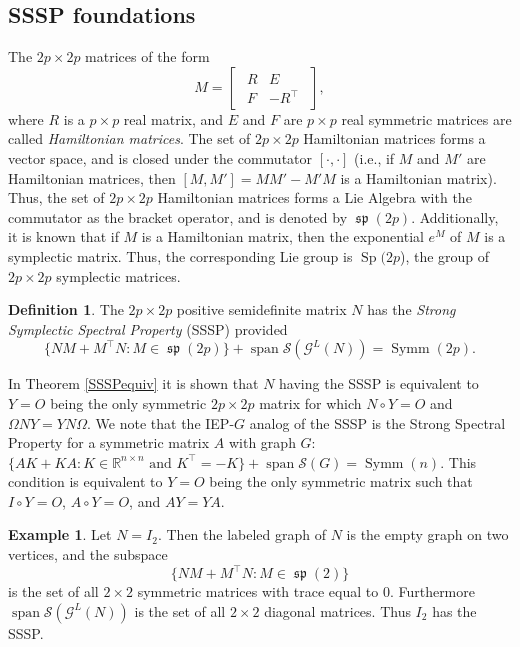 \documentclass[12pt]{article}
\theoremstyle{definition}
\theoremstyle{definition}
\newtheorem{defn}[thm]{Definition}
\theoremstyle{definition}
\newtheorem{ex}[thm]{Example}
\numberwithin{figure}{section}
\numberwithin{equation}{section}
\newcommand{\R}{\mathbb{R}}
\newcommand{\Span}{\operatorname{span}}
\newcommand{\SG}{\mathcal{S}(G)}
\newcommand{\symm}{\operatorname{Symm}}
\newcommand{\Sp}{\operatorname{Sp}}
\newcommand{\spLA}{\operatorname{\mathfrak{sp}}}
\newcommand{\Rnn}{\R^{n\times n}}
\newcommand{\trans}{^{\top}}
\newcommand{\beq}{\begin{equation}}
\newcommand{\eeq}{\end{equation}}
\begin{document}
\subsection{SSSP foundations}
The  $2p \times 2p$ matrices of the form 
\beq\label{Eq:HamForm}
M= \begin{bmatrix}
\begin{array}{cc}
R & E \\ 
F & -R^\top
\end{array} 
\end{bmatrix},
\eeq
where $R$ is a $p\times p$ real matrix, and  $E$ and $F$ are $p\times p$ real symmetric matrices
are called \textit{Hamiltonian matrices}. The set of $2p \times 2p$ Hamiltonian 
matrices {forms} a vector space, and is closed under the commutator $[\cdot, \cdot]$ (i.e., if $M$ and $M'$ are 
Hamiltonian matrices, then $[M,M']=MM'-M'M$ is a Hamiltonian matrix). 
Thus, the set of $2p\times 2p$ Hamiltonian matrices forms a Lie Algebra  with the commutator  as the bracket operator, and is denoted by $\spLA(2p)$. 
Additionally, it is known that if $M$ is a Hamiltonian matrix, then the exponential $e^M$ of $M$ is a symplectic matrix. 
Thus, the corresponding Lie group is $\Sp(2 p$), the group of $2p\times 2p$ symplectic matrices. 


\begin{defn}\label{d:SSSP}
The $2p\times 2p$ positive semidefinite matrix $N$  has the {\it Strong Symplectic Spectral Property} (SSSP) provided
\begin{equation}
\label{SSSP}
\{ NM+ M\trans N\colon M \in \spLA(2p) \} + \Span \mathcal{S}(\mathcal{G}^L(N))   = \symm(2p).
\end{equation}


In Theorem \ref{SSSPequiv} it is shown that  $N$ having the SSSP 
is equivalent to $Y=O$ {being} the only symmetric $2p\times 2p$ 
matrix for which $N\circ Y=O$ and {$\Omega NY=YN \Omega$}.
We note that the {IEP-$G$} analog of the SSSP is the Strong Spectral Property for 
a  symmetric matrix $A$ with graph $G$:
$
\{ AK+KA\colon K \in \Rnn\mbox{ and } K\trans=-K \} + \Span \SG= \symm(n).
$
This condition is equivalent to $Y=O$ being  
the only symmetric matrix 
such that $I \circ Y=O$, $A \circ Y=O$, and  $AY=YA$.
\end{defn}
\begin{ex}
Let $N=I_2$.
Then the labeled graph of $N$ is the empty graph on two vertices, and the subspace
\begin{equation}
\label{tangentspace} 
\{ NM + M\trans N\colon
M \in \spLA(2)\} 
\end{equation} 
 is the set of all $2\times 2$ symmetric matrices with trace equal to $0$. Furthermore  
$\Span \mathcal{S}(\mathcal{G}^L(N))$ is the set of all $2\times 2$ diagonal matrices. 
Thus $I_2$ has the SSSP. 
\end{ex}
\end{document}
